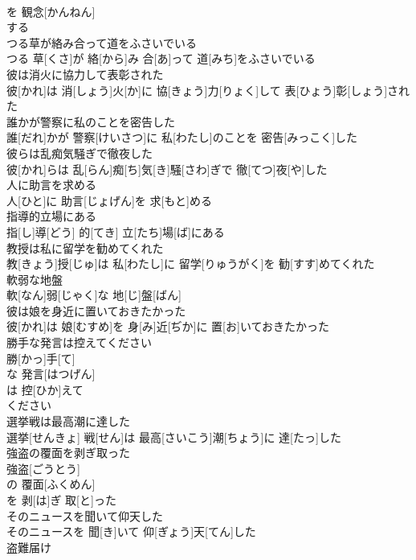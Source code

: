\documentclass[8pt]{extreport}
\begin{document}
\begin{CJK}{UTF8}{min}
\\	を 観念[かんねん]
\\	する 
\\	つる草が絡み合って道をふさいでいる	
\\	つる 草[くさ]が 絡[から]み 合[あ]って 道[みち]をふさいでいる
\\	彼は消火に協力して表彰された	
\\	彼[かれ]は 消[しょう]火[か]に 協[きょう]力[りょく]して 表[ひょう]彰[しょう]された
\\	誰かが警察に私のことを密告した	
\\	誰[だれ]かが 警察[けいさつ]に 私[わたし]のことを 密告[みっこく]した
\\	彼らは乱痴気騒ぎで徹夜した	
\\	彼[かれ]らは 乱[らん]痴[ち]気[き]騒[さわ]ぎで 徹[てつ]夜[や]した
\\	人に助言を求める	
\\	人[ひと]に 助言[じょげん]を 求[もと]める
\\	指導的立場にある	
\\	指[し]導[どう] 的[てき] 立[たち]場[ば]にある
\\	教授は私に留学を勧めてくれた	
\\	教[きょう]授[じゅ]は 私[わたし]に 留学[りゅうがく]を 勧[すす]めてくれた
\\	軟弱な地盤	
\\	軟[なん]弱[じゃく]な 地[じ]盤[ばん]
\\	彼は娘を身近に置いておきたかった	
\\	彼[かれ]は 娘[むすめ]を 身[み]近[ぢか]に 置[お]いておきたかった
\\	勝手な発言は控えてください	
\\	勝[かっ]手[て]
\\	な 発言[はつげん]
\\	は 控[ひか]えて 
\\	ください
\\	選挙戦は最高潮に達した	
\\	選挙[せんきょ] 戦[せん]は 最高[さいこう]潮[ちょう]に 達[たっ]した
\\	強盗の覆面を剥ぎ取った	
\\	強盗[ごうとう]
\\	の 覆面[ふくめん]
\\	を 剥[は]ぎ 取[と]った 
\\	そのニュースを聞いて仰天した	
\\	そのニュースを 聞[き]いて 仰[ぎょう]天[てん]した
\\	盗難届け	

\end{CJK}
\end{document}
